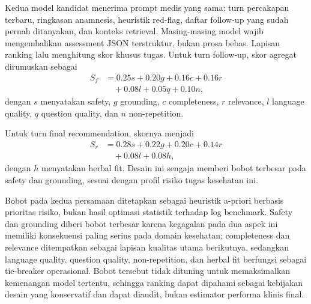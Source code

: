 \documentclass[conference]{IEEEtran}
\begin{document}
Kedua model kandidat menerima prompt medis yang sama: turn percakapan terbaru, ringkasan anamnesis, heuristik red-flag, daftar follow-up yang sudah pernah ditanyakan, dan konteks retrieval. Masing-masing model wajib mengembalikan assessment JSON terstruktur, bukan prosa bebas. Lapisan ranking lalu menghitung skor khusus tugas. Untuk turn follow-up, skor agregat dirumuskan sebagai
\begin{align}
S_f &= 0.25s + 0.20g + 0.16c + 0.16r \nonumber \\
&\quad + 0.08l + 0.05q + 0.10n,
\end{align}
dengan $s$ menyatakan safety, $g$ grounding, $c$ completeness, $r$ relevance, $l$ language quality, $q$ question quality, dan $n$ non-repetition.

Untuk turn final recommendation, skornya menjadi
\begin{align}
S_r &= 0.28s + 0.22g + 0.20c + 0.14r \nonumber \\
&\quad + 0.08l + 0.08h,
\end{align}
dengan $h$ menyatakan herbal fit. Desain ini sengaja memberi bobot terbesar pada safety dan grounding, sesuai dengan profil risiko tugas kesehatan ini.

Bobot pada kedua persamaan ditetapkan sebagai heuristik a-priori berbasis prioritas risiko, bukan hasil optimasi statistik terhadap log benchmark. Safety dan grounding diberi bobot terbesar karena kegagalan pada dua aspek ini memiliki konsekuensi paling serius pada domain kesehatan; completeness dan relevance ditempatkan sebagai lapisan kualitas utama berikutnya, sedangkan language quality, question quality, non-repetition, dan herbal fit berfungsi sebagai tie-breaker operasional. Bobot tersebut tidak dituning untuk memaksimalkan kemenangan model tertentu, sehingga ranking dapat dipahami sebagai kebijakan desain yang konservatif dan dapat diaudit, bukan estimator performa klinis final.
\end{document}
